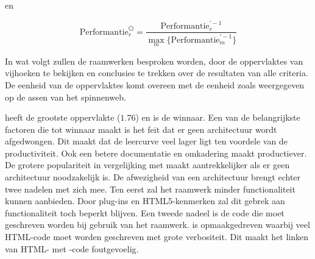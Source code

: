en

\begin{equation}
  \text{Performantie}_r^{\pentagon}= \frac{\text{Performantie}_r^{'-1}}{\underset{m}{\max}\{\text{Performantie}_m^{'-1}\}}
  \label{eq:rel-performantie-2}
\end{equation}



In wat volgt zullen de raamwerken besproken worden, door de oppervlaktes van vijhoeken te bekijken en conclusies te trekken over de resultaten van alle criteria.
De eenheid van de oppervlaktes komt overeen met de eenheid zoals weergegeven op de assen van het spinnenweb.


\jqm{} heeft de grootste oppervlakte ($1.76$) en is de winnaar.
Een van de belangrijkste factoren die \jqm{} tot winnaar maakt is het feit dat er geen architectuur wordt afgedwongen.
Dit maakt dat de leercurve veel lager ligt ten voordele van de productiviteit.
Ook een betere documentatie en omkadering maakt \jqm{} productiever.
De grotere populariteit in vergelijking met \lungo{} maakt \jqm{} aantrekkelijker als er geen architectuur noodzakelijk is.
De afwezigheid van een architectuur brengt echter twee nadelen met zich mee.
Ten eerst zal het raamwerk minder functionaliteit kunnen aanbieden.
Door plug-ins en HTML5-kenmerken zal dit gebrek aan functionaliteit toch beperkt blijven.
Een tweede nadeel is de code die moet geschreven worden bij gebruik van het \jqm{} raamwerk.
\jqm{} is opmaakgedreven waarbij veel HTML-code moet worden geschreven met grote verbositeit.
Dit maakt het linken van HTML- met \js{}-code foutgevoelig.


